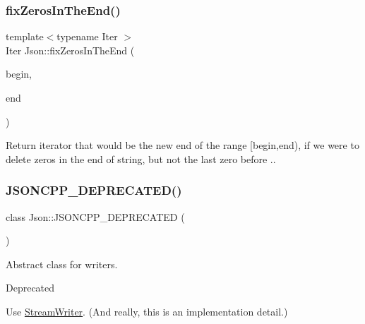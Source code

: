 \subsubsection{\texorpdfstring{fix\+Zeros\+In\+The\+End()}{fixZerosInTheEnd()}}
{\footnotesize\ttfamily template$<$typename Iter $>$ \\
Iter Json\+::fix\+Zeros\+In\+The\+End (\begin{DoxyParamCaption}\item[{Iter}]{begin,  }\item[{Iter}]{end }\end{DoxyParamCaption})}

Return iterator that would be the new end of the range \mbox{[}begin,end), if we were to delete zeros in the end of string, but not the last zero before \textquotesingle{}.\textquotesingle{}. \mbox{\label{namespaceJson_a677dd20047c0c6e4eb16c5f1b53f703c}} 
\subsubsection{\texorpdfstring{J\+S\+O\+N\+C\+P\+P\+\_\+\+D\+E\+P\+R\+E\+C\+A\+T\+E\+D()}{JSONCPP\_DEPRECATED()}\hspace{0.1cm}{\footnotesize\ttfamily [1/2]}}
{\footnotesize\ttfamily class Json\+::\+J\+S\+O\+N\+C\+P\+P\+\_\+\+D\+E\+P\+R\+E\+C\+A\+T\+ED (\begin{DoxyParamCaption}\item[{\char`\"{}Use \hyperlink{classJson_1_1StreamWriter}{Stream\+Writer} instead\char`\"{}}]{ }\end{DoxyParamCaption})}



Abstract class for writers. 

\begin{DoxyRefDesc}{Deprecated}
\item[\hyperlink{deprecated__deprecated000007}{Deprecated}]Use \hyperlink{classJson_1_1StreamWriter}{Stream\+Writer}. (And really, this is an implementation detail.) \end{DoxyRefDesc}
\mbox{\label{namespaceJson_a9013c5f4f4ff260225b101a18af45262}} 
